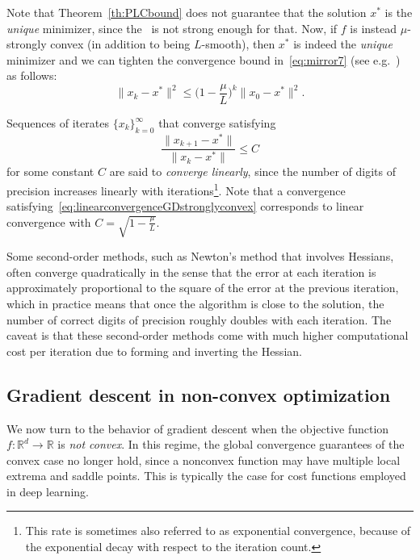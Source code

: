 Note that Theorem~\ref{th:PLCbound} does not guarantee that the solution $x^*$ is the {\em unique} minimizer, since
the \PLC \ is not strong enough for that.
Now, if $f$ is instead $\mu$-strongly convex (in addition to being $L$-smooth), then $x^*$ is indeed the {\em unique} minimizer and we can  tighten the convergence bound in~\eqref{eq:mirror7} (see e.g.~\cite{nesterov2018lectures}) as follows:
\begin{equation}\label{eq:linearconvergenceGDstronglyconvex}
\|x_{k} - x^*\|^2 \le   
\Big(1-\frac{\mu}{L}\Big)^k \|x_{0} - x^*\|^2.
\end{equation}

\begin{remark}
    Sequences of iterates $\{x_k\}_{k=0}^\infty$ that converge satisfying
    $$
\frac{\|x_{k+1} - x^*\|}{{\|x_{k} - x^*\|}} \le C
    $$
 for some constant $C$ are said to {\em converge linearly}, since the number of digits of precision increases linearly with iterations\footnote{This rate is sometimes also referred to as exponential convergence, because of the exponential decay with respect to the iteration count.}. Note that a convergence satisfying~\eqref{eq:linearconvergenceGDstronglyconvex} corresponds to linear convergence with $C = \sqrt{1-\frac{\mu}{L}}$.

 Some second-order methods, such as Newton's method that involves Hessians, often converge quadratically in the sense
 that the error at each iteration is approximately proportional to the square of the error at the previous iteration, 
 which in practice means that once the algorithm is close to the solution, the number of correct digits of precision roughly doubles with each iteration. The caveat is that these second-order methods come with much higher computational cost per iteration due to forming and inverting the Hessian.
\end{remark}


\subsection{Gradient descent in non-convex optimization}\label{s:gd:nonconvex}




We now turn to the behavior of gradient descent when the objective function $f:\mathbb{R}^d \to \mathbb{R}$ is {\em not convex}. In this regime, the global convergence guarantees of the convex case no longer hold, since a nonconvex function may have multiple local extrema and saddle points. 
This is typically the case for cost functions employed in deep learning. 

